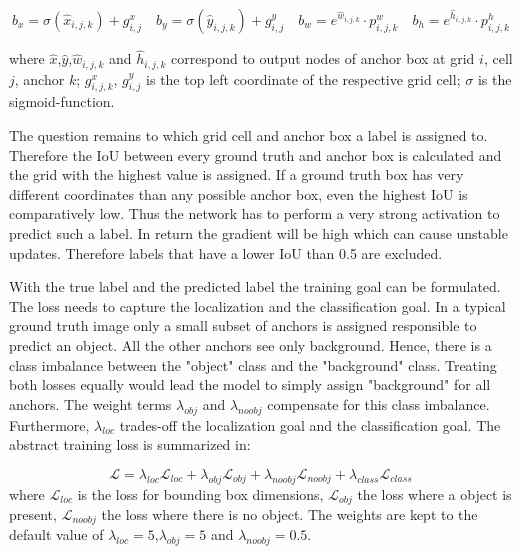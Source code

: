 	
	\begin{equation}
	\label{sec:encoding}
	b_x = \sigma(\hat x_{i,j,k}) + g^x_{i,j}\quad
	b_y = \sigma(\hat y_{i,j,k}) + g^y_{i,j}\quad
	b_w = e^{\hat w_{i,j,k}} \cdot p^w_{i,j,k}\quad
	b_h = e^{\hat h_{i,j,k}} \cdot p^h_{i,j,k}
	\end{equation}
	
	where $\hat{x}$,$\hat{y}$,$\hat w_{i,j,k}$ and $\hat h_{i,j,k}$ correspond to output nodes of anchor box at grid $i$, cell $j$, anchor $k$; $g^x_{i,j,k}$, $g^y_{i,j}$ is the top left coordinate of the respective grid cell; $\sigma$ is the sigmoid-function.
	
	The question remains to which grid cell and anchor box a label is assigned to. Therefore the \ac{IoU} between every ground truth and anchor box is calculated and the grid with the highest value is assigned. If a ground truth box has very different coordinates than any possible anchor box, even the highest \ac{IoU} is comparatively low. Thus the network has to perform a very strong activation to predict such a label. In return the gradient will be high which can cause unstable updates. Therefore labels that have a lower \ac{IoU} than 0.5 are excluded. 
	
	With the true label and the predicted label the training goal can be formulated. The loss needs to capture the localization and the classification goal. In a typical ground truth image only a small subset of anchors is assigned responsible to predict an object. All the other anchors see only background. Hence, there is a class imbalance between the "object" class and the "background" class. Treating both losses equally would lead the model to simply assign "background" for all anchors. The weight terms $\lambda_{obj}$ and $\lambda_{noobj}$ compensate for this class imbalance. Furthermore, $\lambda_{loc}$ trades-off the localization goal and the classification goal. The abstract training loss is summarized in: 

	\begin{equation}
	\mathcal{L} = \lambda_{loc}\mathcal{L}_{loc} + \lambda_{obj}\mathcal{L}_{obj} + \lambda_{noobj}\mathcal{L}_{noobj} + \lambda_{class}\mathcal{L}_{class}
	\end{equation}
	where $\mathcal{L}_{loc}$ is the loss for bounding box dimensions, $\mathcal{L}_{obj}$ the loss where a object is present, $\mathcal{L}_{noobj}$ the loss where there is no object. The weights are kept to the default value of $\lambda_{loc} = 5$,$\lambda_{obj} = 5$ and $\lambda_{noobj} = 0.5$.
	

